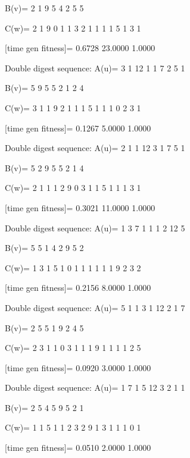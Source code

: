 B(v)=
     2     1     9     5     4     2     5     5

C(w)=
     2     1     9     0     1     1     3     2     1     1     1     1     5     1     3     1

[time gen fitness]=
    0.6728   23.0000    1.0000

Double digest sequence:
A(u)=
     3     1    12     1     1     7     2     5     1

B(v)=
     5     9     5     5     2     1     2     4

C(w)=
     3     1     1     9     2     1     1     1     5     1     1     1     0     2     3     1

[time gen fitness]=
    0.1267    5.0000    1.0000

Double digest sequence:
A(u)=
     2     1     1    12     3     1     7     5     1

B(v)=
     5     2     9     5     5     2     1     4

C(w)=
     2     1     1     1     2     9     0     3     1     1     5     1     1     1     3     1

[time gen fitness]=
    0.3021   11.0000    1.0000

Double digest sequence:
A(u)=
     1     3     7     1     1     1     2    12     5

B(v)=
     5     5     1     4     2     9     5     2

C(w)=
     1     3     1     5     1     0     1     1     1     1     1     1     9     2     3     2

[time gen fitness]=
    0.2156    8.0000    1.0000

Double digest sequence:
A(u)=
     5     1     1     3     1    12     2     1     7

B(v)=
     2     5     5     1     9     2     4     5

C(w)=
     2     3     1     1     0     3     1     1     1     9     1     1     1     1     2     5

[time gen fitness]=
    0.0920    3.0000    1.0000

Double digest sequence:
A(u)=
     1     7     1     5    12     3     2     1     1

B(v)=
     2     5     4     5     9     5     2     1

C(w)=
     1     1     5     1     1     2     3     2     9     1     3     1     1     1     0     1

[time gen fitness]=
    0.0510    2.0000    1.0000


